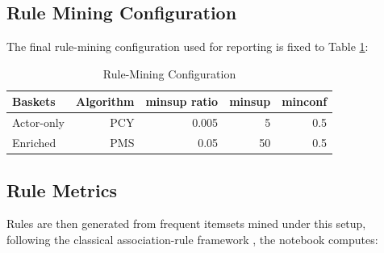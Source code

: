 \documentclass{article}  %
\begin{document}
\subsection{Rule Mining Configuration}
The final rule-mining configuration used for reporting is fixed to Table \ref{tab:17rule_mining_config}:

\begin{table}[!htbp]
    \caption{Rule-Mining Configuration}
    \centering
    \begin{tabular}{lrrrr}
        \toprule
        \textbf{Baskets} & \textbf{Algorithm} & \textbf{minsup ratio}&\textbf{minsup}  
 &minconf\\
        \midrule
        Actor-only   & PCY & 0.005&5   
 &0.5\\
        Enriched     & PMS & 0.05&50   &0.5\\
        \bottomrule
    \end{tabular}
    \label{tab:17rule_mining_config}
\end{table}
\subsection{Rule Metrics}

Rules are then generated from frequent itemsets mined under this setup, following the classical association-rule framework \parencite{yanCONFIDENCEMETRICSASSOCIATION2009}, the notebook computes: 
\end{document}
